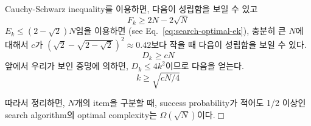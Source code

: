Cauchy-Schwarz inequality를 이용하면, 다음이 성립함을 보일 수 있고
\begin{equation}
  F_k \geq 2 N-2 \sqrt{N} \label{eq:search-optimal-10}
\end{equation}
$E_k \le (2-\sqrt{2})N$임을 이용하면 (see Eq.~\eqref{eq:search-optimal-ek}), 충분히 큰 $N$에 대해서 $c$가 $(\sqrt 2 - \sqrt{2 - \sqrt{2}})^2 \approx 0.42$보다 작을 때 다음이 성립함을 보일 수 있다.
\begin{equation*}
  D_k \ge cN
\end{equation*}
앞에서 우리가 보인 증명에 의하면, $D_k \le 4k^2$이므로 다음을 얻는다.
\begin{equation*}
  k \ge \sqrt{cN/4}
\end{equation*}

따라서 정리하면, $N$개의 item을 구분할 때, success probability가 적어도 1/2 이상인 search algorithm의 optimal complexity는 $\Omega(\sqrt{N})$이다.$\Box$
